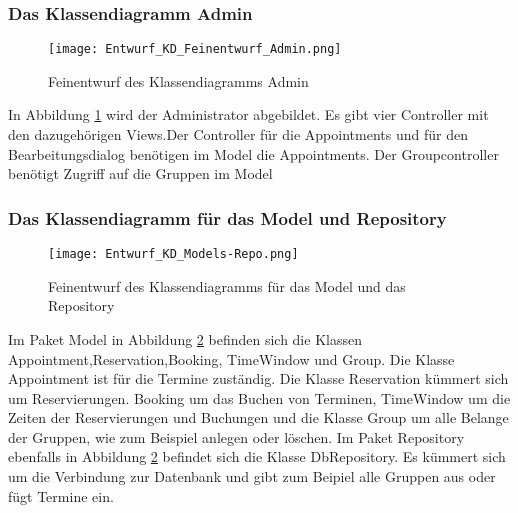 \documentclass[a4paper,10pt]{article}
\begin{document}
 \subsubsection{Das Klassendiagramm Admin}
 \begin{figure}
  \texttt{[image: Entwurf\_KD\_Feinentwurf\_Admin.png]}
  \label{fig:Klassendiagramm_Admin}
  \caption{Feinentwurf des Klassendiagramms Admin}
 \end{figure} 

 In Abbildung \ref{fig:Klassendiagramm_Admin} wird der Administrator abgebildet. Es gibt vier Controller mit den dazugehörigen Views.Der Controller für die Appointments und für den Bearbeitungsdialog benötigen im Model die Appointments. Der Groupcontroller benötigt Zugriff auf die Gruppen im Model
 \subsubsection{Das Klassendiagramm für das Model und Repository}
 
 \begin{figure}
  \texttt{[image: Entwurf\_KD\_Models-Repo.png]}
  \label{fig:Klassendiagramm_Models-Repo}
\caption{Feinentwurf des Klassendiagramms für das Model und das Repository}
 \end{figure} 

Im Paket Model in Abbildung \ref{fig:Klassendiagramm_Models-Repo} befinden sich die Klassen Appointment,Reservation,Booking, TimeWindow und Group. Die Klasse Appointment ist für die Termine zuständig. Die Klasse Reservation kümmert sich um Reservierungen. Booking um das Buchen von Terminen, TimeWindow um die Zeiten der Reservierungen und Buchungen und die Klasse Group um alle Belange der Gruppen, wie zum Beispiel anlegen oder löschen.
Im Paket Repository ebenfalls in Abbildung \ref{fig:Klassendiagramm_Models-Repo} befindet sich die Klasse DbRepository. Es kümmert sich um die Verbindung zur Datenbank und gibt zum Beipiel alle Gruppen aus oder fügt Termine ein.
\end{document}
